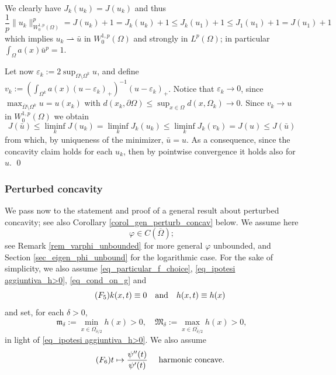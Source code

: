 \documentclass[11pt, reqno]{amsart}
\theoremstyle{definition}
\numberwithin{equation}{section}
\def\eps{\varepsilon}
\def\norm#1{\|#1\|}
\newcommand{\wto}{\rightharpoonup}
\renewenvironment{proof}[1][\proofname]{\medskip \noindent {\bfseries #1. }}{\qed \bigskip}
\begin{document}
\begin{proof}
We clearly have $J_k(u_k) = J(u_{k})$ and thus
$$\frac{1}{p}\norm{u_k}_{W^{1,p}_0(\Omega)}^p = J(u_k) +1= J_k(u_k) +1\leq J_k(u_1) +1\leq J_1(u_1)+1 = J(u_1)+1$$
which implies $u_k \wto \bar{u}$ in $W^{1,p}_0(\Omega)$ and strongly in $L^p(\Omega)$; in particular $\int_{\Omega} a(x) \bar{u}^p =1$. 

Let now $\eps_k:= 2 \sup_{\Omega \setminus \Omega^k} u$, and define $v_k:= (\int_{\Omega^k} a(x) (u-\eps_k)_+)^{-1} (u-\eps_k)_+$. 
Notice that $\eps_k \to 0$, since $\max_{\overline{\Omega} \setminus \Omega^k} u = u(x_k)$ with $d(x_k, \partial \Omega) \leq \sup_{x \in \Omega} d(x, \Omega_k) 
 \to 0$. 
Since $v_k \to u $ in $W^{1,p}_0(\Omega)$ we obtain
$$J(\bar{u}) \leq \liminf_{k} J(u_k) = \liminf_{k} J_k(u_k) \leq \liminf_k J_k(v_k) = J(u) \leq J(\bar{u})$$
from which, by uniqueness of the minimizer, $\bar{u}=u$. As a consequence, since the concavity claim holds for each $u_k$, then by pointwise convergence it holds also for $u$.
\end{proof}


\subsubsection{Perturbed concavity} 
\label{sec_pertub_concav}

We pass now to the statement and proof of a general result about perturbed concavity; see also Corollary \ref{corol_gen_perturb_concav} below.
We assume here 
\begin{equation}\label{eq_cond_phi_boun}
\tag{$\varphi_3$}
\varphi \in C(\overline{\Omega});
\end{equation}
 see Remark \ref{rem_varphi_unbounded} for more general $\varphi$ unbounded, and Section \ref{sec_eigen_phi_unbound} for the logarithmic case. 
For the sake of simplicity, we also assume \eqref{eq_particular_f_choice}, \eqref{eq_ipotesi aggiuntiva_h>0}, \eqref{eq_cond_on_g} and
\begin{equation}\label{eq_cond_sempl_perturb}
\tag{$F_5$}
k(x,t) \equiv 0\quad \hbox{and} \quad h(x,t) \equiv h(x)
\end{equation}
and set, for each $\delta>0$, 
\begin{equation}\label{eq_def_mfrak}
\mathfrak{m}_{\delta}:= \min_{x \in \overline{\Omega_{\delta/2}}} h(x)>0, \quad \mathfrak{M}_{\delta} := \max_{x \in \overline{\Omega_{\delta/2}}} h(x)>0,
\end{equation}
in light of \eqref{eq_ipotesi aggiuntiva_h>0}.
We also assume 
\begin{equation}\label{eq_cond_harm_concave}
\tag{$F_6$}
t \mapsto \frac{\psi''(t)}{\psi'(t)} \quad \hbox{ harmonic concave}.
\end{equation}
\end{document}
